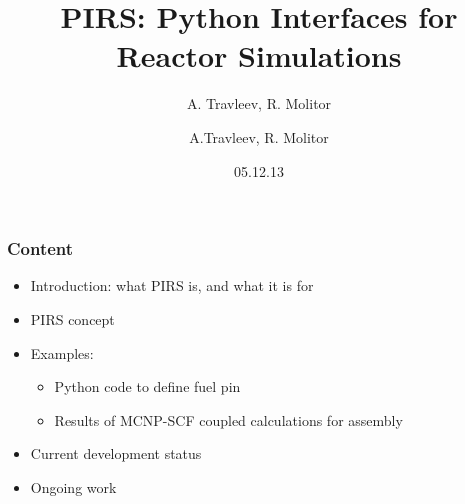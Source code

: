 \documentclass[t]{beamer}
\date{05.12.13}
\title[INR seminar, about PIRS]{PIRS: Python Interfaces for Reactor Simulations}
\subtitle{A. Travleev, R. Molitor}
\author{A.Travleev, R. Molitor}
\institute{Institute for Neutron Physics and Reactor Technology}
\begin{document}
\begin{frame}
  \maketitle
\end{frame}

\begin{frame}\frametitle{Content}

    \begin{itemize}
        \item Introduction: what PIRS is, and what it is for

        \item PIRS concept

        \item Examples:
            \begin{itemize}
                \item Python code to define fuel pin
                \item Results of MCNP-SCF coupled calculations for assembly
            \end{itemize}

        \item Current development status

        \item Ongoing work

    \end{itemize}
\end{frame}

\end{document}

